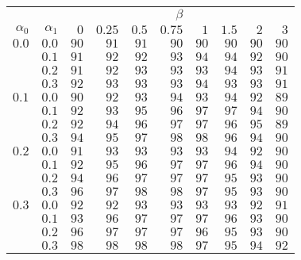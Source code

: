 \begin{tabular}{rr|rrrrrrrr}
\hline\hline
 && \multicolumn{8}{c}{$\beta$}\\
 $\alpha_0$ & $\alpha_1$ & $0$ & $0.25$ & $0.5$ & $0.75$ & $1$ & $1.5$ & $2$ & $3$ \\ 
 \hline
$0.0$ & $0.0$ & $90$ & $91$ & $91$ & $90$ & $90$ & $90$ & $90$ & $90$\\ 
 & $0.1$ & $91$ & $92$ & $92$ & $93$ & $94$ & $94$ & $92$ & $90$\\ 
 & $0.2$ & $91$ & $92$ & $93$ & $93$ & $93$ & $94$ & $93$ & $91$\\ 
 & $0.3$ & $92$ & $93$ & $93$ & $93$ & $94$ & $93$ & $93$ & $91$\\ 
\hline 
 $0.1$ & $0.0$ & $90$ & $92$ & $93$ & $94$ & $93$ & $94$ & $92$ & $89$\\ 
 & $0.1$ & $92$ & $93$ & $95$ & $96$ & $97$ & $97$ & $94$ & $90$\\ 
 & $0.2$ & $92$ & $94$ & $96$ & $97$ & $97$ & $96$ & $95$ & $89$\\ 
 & $0.3$ & $94$ & $95$ & $97$ & $98$ & $98$ & $96$ & $94$ & $90$\\ 
\hline 
 $0.2$ & $0.0$ & $91$ & $93$ & $93$ & $93$ & $93$ & $94$ & $92$ & $90$\\ 
 & $0.1$ & $92$ & $95$ & $96$ & $97$ & $97$ & $96$ & $94$ & $90$\\ 
 & $0.2$ & $94$ & $96$ & $97$ & $97$ & $97$ & $95$ & $93$ & $90$\\ 
 & $0.3$ & $96$ & $97$ & $98$ & $98$ & $97$ & $95$ & $93$ & $90$\\ 
\hline 
 $0.3$ & $0.0$ & $92$ & $92$ & $93$ & $93$ & $93$ & $93$ & $92$ & $91$\\ 
 & $0.1$ & $93$ & $96$ & $97$ & $97$ & $97$ & $96$ & $93$ & $90$\\ 
 & $0.2$ & $96$ & $97$ & $97$ & $97$ & $96$ & $95$ & $93$ & $90$\\ 
 & $0.3$ & $98$ & $98$ & $98$ & $98$ & $97$ & $95$ & $94$ & $92$\\ 
 \hline 
 \end{tabular}